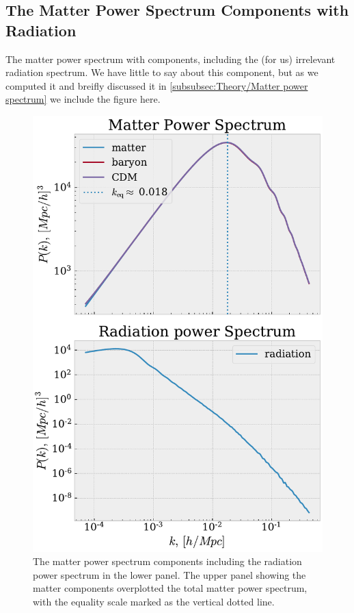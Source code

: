 \documentclass[10pt,a4paper]{article}
\begin{document}
\begin{appendices}
\section{The Matter Power Spectrum Components with Radiation}
\label{Asec: Radiation component}
The matter power spectrum with components, including the (for us) irrelevant radiation spectrum. We have little to say about this component, but as we computed it and breifly discussed it in \cref{subsubsec:Theory/Matter power spectrum} we include the figure here.
\begin{figure}[ht!]
  \centering
  \includegraphics[scale=0.5]{../figs/comp_PS.pdf}
  \caption{The matter power spectrum components including the radiation power spectrum in the lower panel. The upper panel showing the matter components overplotted the total matter power spectrum, with the equality scale marked as the vertical dotted line.}
  \label{fig: radiation component power spectrum}
\end{figure}

\end{appendices}
\end{document}
